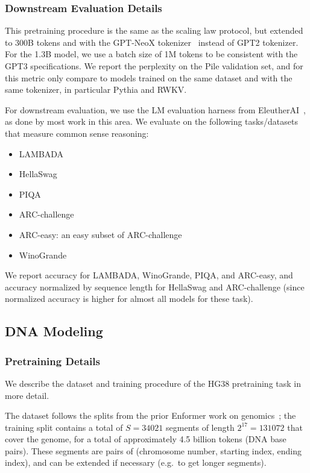 %

%

\subsubsection{Downstream Evaluation Details}

This pretraining procedure is the same as the scaling law protocol, but extended to 300B tokens and with the GPT-NeoX tokenizer~\citep{black2022gpt} instead of GPT2 tokenizer.
For the 1.3B model, we use a batch size of 1M tokens to be consistent with the GPT3 specifications.
We report the perplexity on the Pile validation set, and for this metric only compare to models trained on the same dataset and with the same tokenizer, in particular Pythia and RWKV.

For downstream evaluation, we use the LM evaluation harness from EleutherAI~\citep{eval-harness}, as done by most work in this area.
We evaluate on the following tasks/datasets that measure common sense reasoning:
\begin{itemize}
  \item LAMBADA~\citep{paperno2016lambada}
  \item HellaSwag~\citep{zellers2019hellaswag}
  \item PIQA~\citep{bisk2020piqa}
  \item ARC-challenge~\citep{clark2018think}
  \item ARC-easy: an easy subset of ARC-challenge
  \item WinoGrande~\citep{sakaguchi2021winogrande}
\end{itemize}

We report accuracy for LAMBADA, WinoGrande, PIQA, and ARC-easy, and accuracy normalized by sequence length for HellaSwag and ARC-challenge (since normalized accuracy is higher for almost all models for these task).

\subsection{DNA Modeling}

\subsubsection{Pretraining Details}

We describe the dataset and training procedure of the HG38 pretraining task in more detail.

The dataset follows the splits from the prior Enformer work on genomics~\citep{avsec2021effective}; the training split contains a total of $S=34021$ segments of length $2^{17}=131072$ that cover the genome,
for a total of approximately 4.5 billion tokens (DNA base pairs).
These segments are pairs of (chromosome number, starting index, ending index), and can be extended if necessary (e.g.\ to get longer segments).

